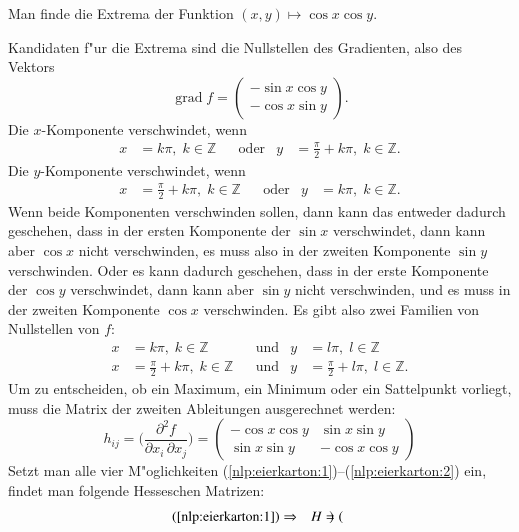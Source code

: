 \begin{beispiel}
Man finde die Extrema der Funktion $(x,y)\mapsto \cos x\cos y$.
\bigskip

{\parindent 0pt
Kandidaten f"ur die Extrema sind die Nullstellen des Gradienten, also
des Vektors}
\[
\operatorname{grad}f = \begin{pmatrix}
-\sin x\cos y\\
-\cos x\sin y
\end{pmatrix}.
\]
Die $x$-Komponente verschwindet, wenn 
\begin{align*}
x&=k\pi,\; k\in\mathbb Z & &\text{oder} & y&=\frac{\pi}2+k\pi,\;k\in\mathbb Z.
\end{align*}
Die $y$-Komponente verschwindet, wenn
\begin{align*}
x&=\frac{\pi}2+k\pi,\;k\in\mathbb Z
& &\text{oder} &
y&=k\pi,\; k\in\mathbb Z.
\end{align*}
Wenn beide Komponenten verschwinden sollen, dann kann das entweder
dadurch geschehen, dass in der ersten Komponente der $\sin x$ 
verschwindet, dann kann aber $\cos x$ nicht verschwinden, es muss
also in der zweiten Komponente $\sin y$ verschwinden.
Oder es kann dadurch geschehen, dass in der erste Komponente
der $\cos y$ verschwindet, dann kann aber $\sin y$ nicht verschwinden,
und es muss in der zweiten Komponente $\cos x$ verschwinden.
Es gibt also zwei Familien von Nullstellen von $f$:
\begin{align}
x&=k\pi,\;k\in\mathbb Z
& &\text{und} &
y&=l\pi,\;l\in\mathbb Z
\label{nlp:eierkarton:1}
\\
x&=\frac{\pi}2+k\pi,\;k\in\mathbb Z
&&\text{und}&
y&=\frac{\pi}2+l\pi,\;l\in\mathbb Z.
\label{nlp:eierkarton:2}
\end{align}
Um zu entscheiden, ob ein Maximum, ein Minimum oder ein Sattelpunkt vorliegt,
muss die Matrix der zweiten Ableitungen ausgerechnet werden:
\begin{equation}
h_{ij}=
\biggl(
\frac{\partial^2 f}{\partial x_i\,\partial x_j}
\biggr)
=
\begin{pmatrix}
-\cos x\cos y &  \sin x \sin y\\
 \sin x\sin y & -\cos x \cos y
\end{pmatrix}
\end{equation}
Setzt man alle vier M"oglichkeiten
(\ref{nlp:eierkarton:1})--(\ref{nlp:eierkarton:2}) ein,
findet man folgende Hesseschen Matrizen:
\begin{align*}
(\ref{nlp:eierkarton:1})
&\Rightarrow
&
H
&=
\begin{pmatrix}

\end{pmatrix}
\end{align*}
\end{beispiel}
